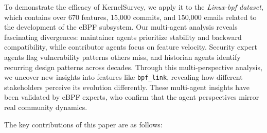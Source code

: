 \documentclass[sigconf,review,anonymous]{acmart}
\begin{document}
To demonstrate the efficacy of KernelSurvey, we apply it to the \textit{Linux-bpf dataset}, which contains over 670 features, 15,000 commits, and 150,000 emails related to the development of the eBPF subsystem. Our multi-agent analysis reveals fascinating divergences: maintainer agents prioritize stability and backward compatibility, while contributor agents focus on feature velocity. Security expert agents flag vulnerability patterns others miss, and historian agents identify recurring design patterns across decades. Through this multi-perspective analysis, we uncover new insights into features like \texttt{bpf\_link}, revealing how different stakeholders perceive its evolution differently. These multi-agent insights have been validated by eBPF experts, who confirm that the agent perspectives mirror real community dynamics.

% 
The key contributions of this paper are as follows:
\end{document}
